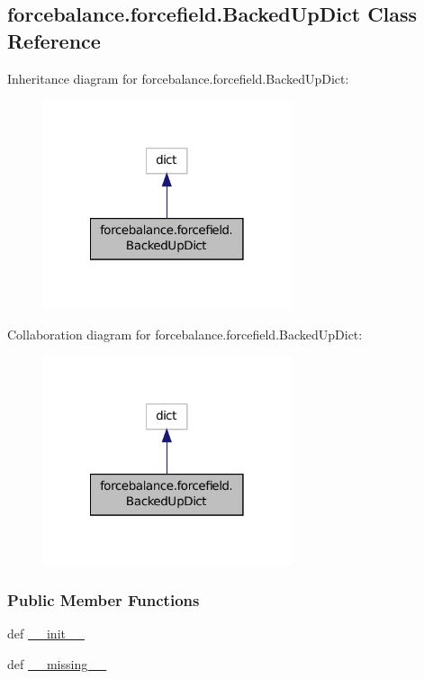 \hypertarget{classforcebalance_1_1forcefield_1_1BackedUpDict}{\subsection{forcebalance.\-forcefield.\-Backed\-Up\-Dict Class Reference}
\label{classforcebalance_1_1forcefield_1_1BackedUpDict}
}


Inheritance diagram for forcebalance.\-forcefield.\-Backed\-Up\-Dict\-:
\nopagebreak
\begin{figure}[H]
\begin{center}
\leavevmode
\includegraphics[width=206pt]{classforcebalance_1_1forcefield_1_1BackedUpDict__inherit__graph}
\end{center}
\end{figure}


Collaboration diagram for forcebalance.\-forcefield.\-Backed\-Up\-Dict\-:
\nopagebreak
\begin{figure}[H]
\begin{center}
\leavevmode
\includegraphics[width=206pt]{classforcebalance_1_1forcefield_1_1BackedUpDict__coll__graph}
\end{center}
\end{figure}
\subsubsection*{Public Member Functions}
\begin{DoxyCompactItemize}
\item 
def \hyperlink{classforcebalance_1_1forcefield_1_1BackedUpDict_a82e592b405ab38fa3c9d4e0fd27d3545}{\-\_\-\-\_\-init\-\_\-\-\_\-}
\item 
def \hyperlink{classforcebalance_1_1forcefield_1_1BackedUpDict_a1b1c8443d8927bfad95b880dc3dc9594}{\-\_\-\-\_\-missing\-\_\-\-\_\-}
\end{DoxyCompactItemize}
